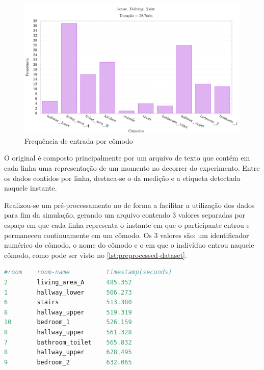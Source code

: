 \begin{figure}[htb]
	
	\begin{center}
		
		\caption{\label{fig:dataset-histogram}Frequência de entrada por cômodo}
		\includegraphics[width=0.95\linewidth]{img/dataset-histogram}
		\fonte{\autoriapropria}
		
	\end{center}

\end{figure}

O \dataset original é composto principalmente por um arquivo de texto que contém em cada linha uma representação de um momento no decorrer do experimento. Entre os dados contidos por linha, destaca-se o \timestamp da medição e a etiqueta detectada naquele instante. 

Realizou-se um pré-processamento no \dataset de forma a facilitar a utilização dos dados para fim da simulação, gerando um arquivo contendo 3 valores separadas por espaço em que cada linha representa o instante em que o participante entrou e permaneceu continuamente em um cômodo. Os 3 valores são: um identificador numérico do cômodo, o nome do cômodo e o \timestamp em que o indivíduo entrou naquele cômodo, como pode ser visto no \autoref{lst:preprocessed-dataset}.
\begin{lstlisting}[float=htb, language=python, caption={Parte do \dataset pré-processado}, label=lst:preprocessed-dataset]
#room    room-name          timestamp(seconds)
2        living_area_A      485.352
1        hallway_lower      506.273
6        stairs             513.380
8        hallway_upper      519.319
10       bedroom_1          526.159
8        hallway_upper      561.328
7        bathroom_toilet    565.832
8        hallway_upper      628.495
9        bedroom_2          632.065
\end{lstlisting}
	
